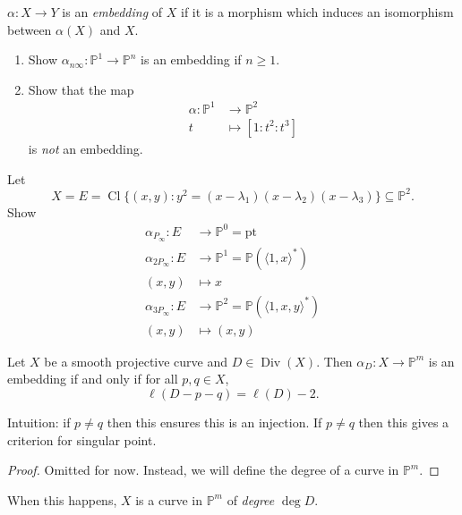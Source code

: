 \documentclass[a4paper]{article}
\DeclareMathOperator{\Cl}{Cl}
\renewcommand*{\P}{\mathbb{P}}
\DeclareMathOperator{\Div}{Div} %
\begin{document}
\begin{definition}[embedding]
  \(\alpha: X \to Y\) is an \emph{embedding} of \(X\) if it is a morphism which induces an isomorphism between \(\alpha(X)\) and \(X\).
\end{definition}

\begin{ex}\leavevmode
  \begin{enumerate}
  \item Show \(\alpha_{n \infty}: \P^1 \to \P^n\) is an embedding if \(n \geq 1\).
  \item Show that the map
    \begin{align*}
      \alpha: \P^1 &\to \P^2 \\
      t &\mapsto [1: t^2 : t^3]
    \end{align*}
    is \emph{not} an embedding.
  \end{enumerate}
\end{ex}

\begin{ex}
  Let
  \[
    X = E = \Cl \{(x, y): y^2 = (x - \lambda_1)(x - \lambda_2)(x - \lambda_3)\} \subseteq \P^2.
  \]
  Show
  \begin{align*}
    \alpha_{P_\infty}: E &\to \P^0 = \text{pt} \\
    \alpha_{2 P_\infty}: E &\to \P^1 = \P(\langle 1, x \rangle^*) \\
    (x, y) &\mapsto x \\
    \alpha_{3 P_\infty}: E &\to \P^2 = \P(\langle 1, x, y \rangle^*) \\
    (x, y) &\mapsto (x, y)
  \end{align*}
\end{ex}

\begin{theorem}
  Let \(X\) be a smooth projective curve and \(D \in \Div(X)\). Then \(\alpha_D: X \to \P^m\) is an embedding if and only if for all \(p, q \in X\),
  \[
    \ell(D - p - q) = \ell(D) - 2.
  \]
\end{theorem}
Intuition: if \(p \neq q\) then this ensures this is an injection. If \(p \neq q\) then this gives a criterion for singular point.

\begin{proof}
  Omitted for now. Instead, we will define the degree of a curve in \(\P^m\).
\end{proof}

When this happens, \(X\) is a curve in \(\P^m\) of \emph{degree} \(\deg D\).
\end{document}

